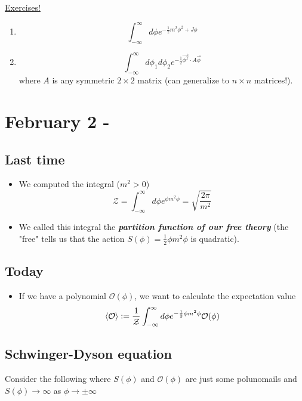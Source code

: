 \documentclass{article}
\newcommand{\defeq}{\vcentcolon=}
\begin{document}
\vskip 0.5cm
\begin{dottedbox}
  \underline{Exercises!}

  \vskip 0.5cm
  \begin{enumerate}
    \item \[ \int_{-\infty}^{\infty} d\phi e^{-\frac{1}{2}m^2 \phi^2 + J\phi} \]
    \item \[ \int_{-\infty}^{\infty} d\phi_1 d\phi_2 e^{-\frac{1}{2} \vec{\phi^T} \cdot A \vec{\phi} } \]
    where $A$ is any symmetric $2 \times 2$ matrix (can generalize to $n \times n$ matrices!).
  \end{enumerate}
\end{dottedbox}


\pagebreak
\section{February 2 - } 

\subsection{Last time}
\begin{itemize}
  \item We computed the integral ($m^2 > 0$)
  \[ \mathcal{Z} = \int_{-\infty}^{\infty} d\phi e^{\phi m^2 \phi} = \sqrt{\frac{2\pi}{m^2}} \]
  \item We called this integral the \emph{\textbf{partition function of our free theory}} (the "free" tells us that the action $S(\phi) = \frac{1}{2}\phi m^2 \phi$ is quadratic).
\end{itemize}

\vskip 1cm
\subsection{Today}
\begin{itemize}
  \item If we have a polynomial $\mathcal{O}(\phi)$, we want to calculate the expectation value 
  \[ \langle \mathcal{O} \rangle \defeq \frac{1}{\mathcal{Z}}\int_{-\infty}^{\infty} d\phi e^{-\frac{1}{2}\phi m^2 \phi} \mathcal{O}(\phi) \]
\end{itemize}

\vskip 1cm
\subsection{Schwinger-Dyson equation}

Consider the following where $S(\phi)$ and $\mathcal{O}(\phi)$ are just some polunomails and $S(\phi) \rightarrow \infty$ as $\phi \rightarrow \pm \infty$
\end{document}

